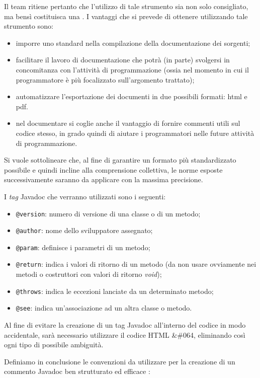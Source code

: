 {Il team ritiene pertanto che l'utilizzo di tale strumento sia non solo consigliato, ma bensì costituisca una . I vantaggi che si prevede di ottenere utilizzando tale strumento sono:

\begin{itemize}
	\item imporre uno standard nella compilazione della documentazione dei sorgenti;
	\item facilitare il lavoro di documentazione che potrà (in parte) svolgersi in concomitanza con l'attività di programmazione (ossia nel momento in cui il programmatore è più focalizzato sull'argomento trattato);
	\item automatizzare l'esportazione dei documenti in due possibili formati: html e pdf.
	\item nel documentare si coglie anche il vantaggio di fornire commenti utili sul codice stesso, in grado quindi di aiutare i programmatori nelle future attività di programmazione.
\end{itemize}

Si vuole sottolineare che, al fine di garantire un formato più standardizzato possibile e quindi incline alla comprensione collettiva, le norme esposte successivamente saranno da applicare con la massima precisione.


I \textit{tag} Javadoc che verranno utilizzati sono i seguenti:
\begin{itemize}
\item \verb+@version+: numero di versione di una classe o di un metodo;
\item \verb+@author+: nome dello sviluppatore assegnato;
\item \verb+@param+: definisce i parametri di un metodo;
\item \verb+@return+: indica i valori di ritorno di un metodo (da non usare ovviamente nei metodi o costruttori con valori di ritorno \textit{void});
\item \verb+@throws+: indica le eccezioni lanciate da un determinato metodo;
\item \verb+@see+: indica un'associazione ad un altra classe o metodo.

\end{itemize}

Al fine di evitare la creazione di un tag Javadoc all'interno del codice in modo accidentale, sarà necessario utilizzare il codice HTML \&\#064, eliminando così ogni tipo di possibile ambiguità.

Definiamo in conclusione le convenzioni da utilizzare per la creazione di un commento Javadoc ben strutturato ed efficace :

}
